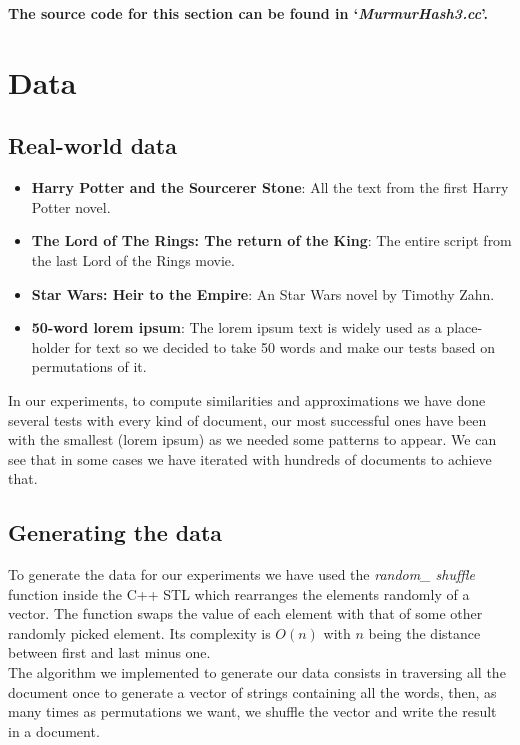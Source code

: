 \documentclass[12pt]{article}
\begin{document}
{\begin{lstlisting}[mathescape=true]
\end{lstlisting}

\textbf{The source code for this section can be found in `\textit{MurmurHash3.cc}'.}
\bigskip

\section{Data} %

\subsection{Real-world data}
\begin{itemize}
\item \textbf{Harry Potter and the Sourcerer Stone}: All the text from the first Harry Potter novel.
\item \textbf{The Lord of The Rings: The return of the King}: The entire script from the last Lord of the Rings movie.
\item \textbf{Star Wars: Heir to the Empire}:  An Star Wars novel by Timothy Zahn. 
\item \textbf{50-word lorem ipsum}: The lorem ipsum text is widely used as a place-holder for text so we decided to take 50 words and make our tests based on permutations of it.
\end{itemize}
In our experiments, to compute similarities and approximations we have done several tests with every kind of document, our most successful ones have been with the smallest (lorem ipsum) as we needed some patterns to appear. We can see that in some cases we have iterated with hundreds of documents to achieve that. 

\subsection{Generating the data} \label{generatingData}

To generate the data for our experiments we have used the \textit{random\_ shuffle} function inside the C++ STL which rearranges the elements randomly of a vector. The function swaps the value of each element with that of some other randomly picked element. Its complexity is $O(n)$ with $n$ being  the distance between first and last minus one.\\

The algorithm we implemented to generate our data consists in traversing all the document once to generate a vector of strings containing all the words, then, as many times as permutations we want, we shuffle the vector and write the result in a document. \\

}
\end{document}
